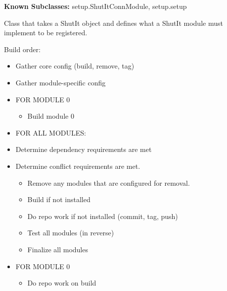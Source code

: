 \textbf{Known Subclasses:}
setup.ShutItConnModule,
    setup.setup

Class that takes a ShutIt object and defines what a ShutIt module must 
implement to be registered.

Build order:

\begin{itemize}
\setlength{\parskip}{0.6ex}
  \item Gather core config (build, remove, tag)

  \item Gather module-specific config

  \item FOR MODULE 0

    \begin{itemize}
    \setlength{\parskip}{0.6ex}
      \item Build module 0

    \end{itemize}

  \item FOR ALL MODULES:

  \item Determine dependency requirements are met

  \item Determine conflict requirements are met.

    \begin{itemize}
    \setlength{\parskip}{0.6ex}
      \item Remove any modules that are configured for removal.

      \item Build if not installed

      \item Do repo work if not installed (commit, tag, push)

      \item Test all modules (in reverse)

      \item Finalize all modules

    \end{itemize}

  \item FOR MODULE 0

    \begin{itemize}
    \setlength{\parskip}{0.6ex}
      \item Do repo work on build

    \end{itemize}

\end{itemize}


